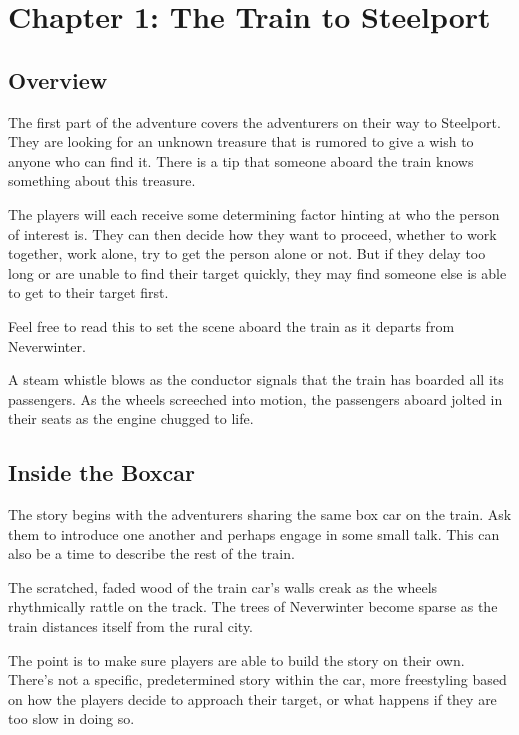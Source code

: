 \documentclass[letterpaper,10pt,twoside,twocolumn,openany]{dndbook}
\begin{document}

\chapter{Chapter 1: The Train to Steelport}

\section{Overview}

The first part of the adventure covers the adventurers on their way to Steelport.  They are looking for an unknown treasure that is rumored to give a wish to anyone who can find it.  There is a tip that someone aboard the train knows something about this treasure.  

The players will each receive some determining factor hinting at who the person of interest is.  They can then decide how they want to proceed, whether to work together, work alone, try to get the person alone or not.  But if they delay too long or are unable to find their target quickly, they may find someone else is able to get to their target first.  

Feel free to read this to set the scene aboard the train as it departs from Neverwinter.
 
\begin{quotebox}
A steam whistle blows as the conductor signals that the train has boarded all its passengers. As the wheels screeched into motion, the passengers aboard jolted in their seats as the engine chugged to life. 
\end{quotebox}

\section{Inside the Boxcar}
The story begins with the adventurers sharing the same box car on the train. Ask them to introduce one another and perhaps engage in some small talk.  This can also be a time to describe the rest of the train.  

\begin{quotebox}
The scratched, faded wood of the train car's walls creak as the wheels rhythmically rattle on the track.  The trees of Neverwinter become sparse as the train distances itself from the rural city.
\end{quotebox}

The point is to make sure players are able to build the story on their own.  There's not a specific, predetermined story within the car, more freestyling based on how the players decide to approach their target, or what happens if they are too slow in doing so.
\end{document}

